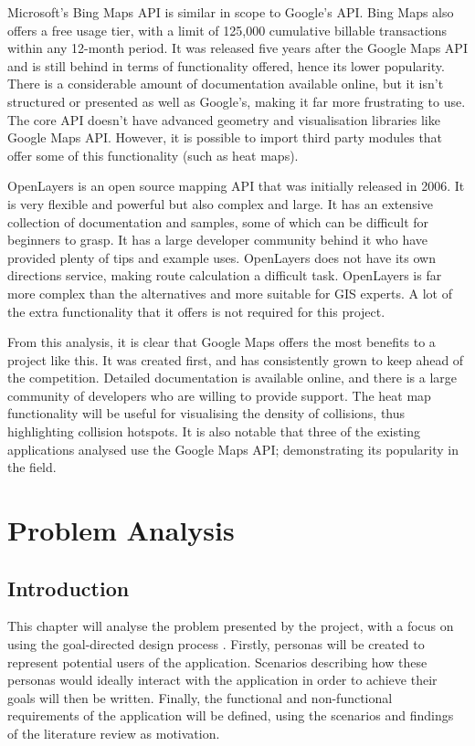 \documentclass[authoryearcitations]{UoYCSproject}
\begin{document}
Microsoft's Bing Maps API \citep{Microsoft} is similar in scope to Google's API. Bing Maps also offers a free usage tier, with a limit of 125,000 cumulative billable transactions within any 12-month period. It was released five years after the Google Maps API and is still behind in terms of functionality offered, hence its lower popularity. There is a considerable amount of documentation available online, but it isn't structured or presented as well as Google's, making it far more frustrating to use. The core API doesn't have advanced geometry and visualisation libraries like Google Maps API. However, it is possible to import third party modules that offer some of this functionality (such as heat maps). 

OpenLayers \citep{OpenLayers} is an open source mapping API that was initially released in 2006. It is very flexible and powerful but also complex and large. It has an extensive collection of documentation and samples, some of which can be difficult for beginners to grasp. It has a large developer community behind it who have provided plenty of tips and example uses. OpenLayers does not have its own directions service, making route calculation a difficult task. OpenLayers is far more complex than the alternatives and more suitable for GIS experts. A lot of the extra functionality that it offers is not required for this project.

From this analysis, it is clear that Google Maps offers the most benefits to a project like this. It was created first, and has consistently grown to keep ahead of the competition. Detailed documentation is available online, and there is a large community of developers who are willing to provide support. The heat map functionality will be useful for visualising the density of collisions, thus highlighting collision hotspots. It is also notable that three of the existing applications analysed use the Google Maps API; demonstrating its popularity in the field.

\chapter{Problem Analysis}

\section{Introduction}

This chapter will analyse the problem presented by the project, with a focus on using the goal-directed design process \citep{Cooper2007}. Firstly, personas will be created to represent potential users of the application. Scenarios describing how these personas would ideally interact with the application in order to achieve their goals will then be written. Finally, the functional and non-functional requirements of the application will be defined, using the scenarios and findings of the literature review as motivation. 
\end{document}
